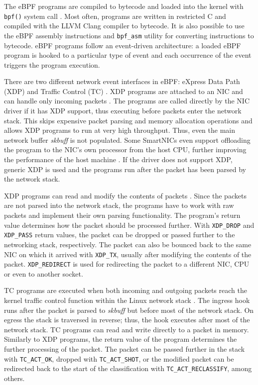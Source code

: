 \documentclass[english, 12pt, a4paper, sci, utf8, a-2b, online]{aaltothesis}
\newcommand{\mycomment}[3]{\textcolor{#1}{#2:~#3}}
\newcommand{\jb}[1]{\noindent\mycomment{aaltoRed}{JB}{#1}}
\begin{document}
The eBPF programs are compiled to bytecode and loaded into the kernel with \lstinline{bpf()} system call \cite{miano2021framework}.
Most often, programs are written in restricted C and compiled with the LLVM Clang compiler to bytecode.
It is also possible to use the eBPF assembly instructions and \lstinline{bpf_asm} utility for converting instructions to bytecode.
eBPF programs follow an event-driven architecture: a loaded eBPF program is hooked to a particular type of event and each occurrence of the event triggers the program execution.

There are two different network event interfaces in eBPF: eXpress Data Path (XDP) and Traffic Control (TC) \cite{miano2021framework}.
XDP programs are attached to an NIC and can handle only incoming packets \cite{hoiland2018express}.
The programs are called directly by the NIC driver if it has XDP support, thus executing before packets enter the network stack.
This skips expensive packet parsing and memory allocation operations and allows XDP programs to run at very high throughput.
Thus, even the main network buffer \emph{skbuff} is not populated.
Some SmartNICs even support offloading the program to the NIC's own processor from the host CPU, further improving the performance of the host machine \cite{cilium-program-types}.
If the driver does not support XDP, generic XDP is used and the programs run after the packet has been parsed by the network stack.

XDP programs can read and modify the contents of packets \cite{vieira2020fast}.
Since the packets are not parsed into the network stack, the programs have to work with raw packets and implement their own parsing functionality.
The program's return value determines how the packet should be processed further.
With \lstinline{XDP_DROP} and \lstinline{XDP_PASS} return values, the packet can be dropped or passed further to the networking stack, respectively.
The packet can also be bounced back to the same NIC on which it arrived with \lstinline{XDP_TX}, usually after modifying the contents of the packet.
\lstinline{XDP_REDIRECT} is used for redirecting the packet to a different NIC, CPU or even to another socket.

TC programs are executed when both incoming and outgoing packets reach the kernel traffic control function within the Linux network stack \cite{vieira2020fast}.
The ingress hook runs after the packet is parsed to \emph{skbuff} but before most of the network stack.
On egress the stack is traversed in reverse; thus, the hook executes after most of the network stack.
TC programs can read and write directly to a packet in memory.
Similarly to XDP programs, the return value of the program determines the further processing of the packet.
The packet can be passed further in the stack with \lstinline{TC_ACT_OK}, dropped with \lstinline{TC_ACT_SHOT}, or the modified packet can be redirected back to the start of the classification with \lstinline{TC_ACT_RECLASSIFY}, among others.
\end{document}
